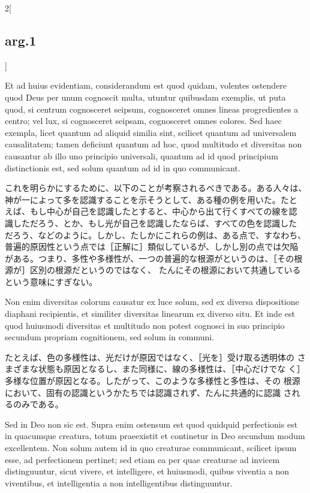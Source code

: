 \documentclass[paper=a4paper,fontsize=10pt,jafontsize=9pt,titlepage]{jlreq}
\begin{document}
\begin{paracol}{2}[\subsection{arg.1}]
\switchcolumn*

Et ad huius evidentiam, considerandum est quod quidam, volentes
ostendere quod Deus per unum cognoscit multa, utuntur quibusdam
exemplis, ut puta quod, si centrum cognosceret seipsum, cognosceret
omnes lineas progredientes a centro; vel lux, si cognosceret seipsam,
cognosceret omnes colores. Sed haec exempla, licet quantum ad aliquid
similia sint, scilicet quantum ad universalem causalitatem; tamen
deficiunt quantum ad hoc, quod multitudo et diversitas non causantur
ab illo uno principio universali, quantum ad id quod principium
distinctionis est, sed solum quantum ad id in quo communicant.

\switchcolumn

これを明らかにするために、以下のことが考察されるべきである。ある人々は、
神が一によって多を認識することを示そうとして、ある種の例を用いた。たと
えば、もし中心が自己を認識したとすると、中心から出て行くすべての線を認
識しただろう、とか、もし光が自己を認識したならば、すべての色を認識した
だろう、などのように。しかし、たしかにこれらの例は、ある点で、すなわち、
普遍的原因性という点では［正解に］類似しているが、しかし別の点では欠陥
がある。つまり、多性や多様性が、一つの普遍的な根源がというのは、［その根源が］区別の根源だというのではなく、
たんにその根源において共通しているという意味にすぎない。

\switchcolumn*

Non enim diversitas colorum causatur ex luce solum, sed ex diversa
dispositione diaphani recipientis, et similiter diversitas linearum ex
diverso situ. Et inde est quod huiusmodi diversitas et multitudo non
potest cognosci in suo principio secundum propriam cognitionem, sed
solum in communi.

\switchcolumn

たとえば、色の多様性は、光だけが原因ではなく、［光を］受け取る透明体の
さまざまな状態も原因となるし、また同様に、線の多様性は、［中心だけでな
く］多様な位置が原因となる。したがって、このような多様性と多性は、その
根源において、固有の認識というかたちでは認識されず、たんに共通的に認識
されるのみである。

\switchcolumn*

Sed in Deo non sic est. Supra enim ostensum est quod quidquid
perfectionis est in quacumque creatura, totum praeexistit et
continetur in Deo secundum modum excellentem. Non solum autem id in
quo creaturae communicant, scilicet ipsum esse, ad perfectionem
pertinet; sed etiam ea per quae creaturae ad invicem distinguuntur,
sicut vivere, et intelligere, et huiusmodi, quibus viventia a non
viventibus, et intelligentia a non intelligentibus distinguuntur.


\end{paracol}
\end{document}

